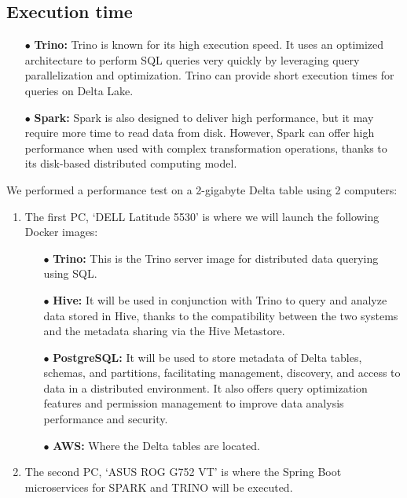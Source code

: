 \subsection{Execution time}
\begin{enumerate}
\item[$\bullet$] \textbf{Trino:} Trino is known for its high execution speed. It uses an optimized architecture to perform SQL queries very quickly by leveraging query parallelization and optimization. Trino can provide short execution times for queries on Delta Lake.
\item[$\bullet$] \textbf{Spark:} Spark is also designed to deliver high performance, but it may require more time to read data from disk. However, Spark can offer high performance when used with complex transformation operations, thanks to its disk-based distributed computing model.
\end{enumerate}

We performed a performance test on a 2-gigabyte Delta table using 2 computers:
\begin{enumerate}
\item The first PC, `DELL Latitude 5530' is where we will launch the following Docker images:
\begin{enumerate}
\item[$\bullet$] \textbf{Trino:} This is the Trino server image for distributed data querying using SQL.
\item[$\bullet$] \textbf{Hive:} It will be used in conjunction with Trino to query and analyze data stored in Hive, thanks to the compatibility between the two systems and the metadata sharing via the Hive Metastore.
\item[$\bullet$] \textbf{PostgreSQL:} It will be used to store metadata of Delta tables, schemas, and partitions, facilitating management, discovery, and access to data in a distributed environment. It also offers query optimization features and permission management to improve data analysis performance and security.
\item[$\bullet$] \textbf{AWS:} Where the Delta tables are located.
\end{enumerate}
\item The second PC, `ASUS ROG G752 VT' is where the Spring Boot microservices for SPARK and TRINO will be executed.
\end{enumerate}

